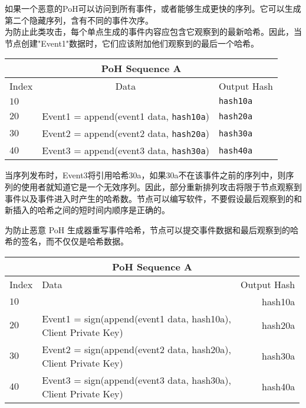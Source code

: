 \documentclass[12pt, uft8]{ctexart}
\begin{document}
如果一个恶意的PoH可以访问到所有事件，或者能够生成更快的序列。它可以生成第二个隐藏序列，含有不同的事件次序。\\

为防止此类攻击，每个单点生成的事件内容应包含它观察到的最新哈希。因此，当节点创建"Event1"数据时，它们应该附加他们观察到的最后一个哈希。    \\

\begin{center}
  \begin{tabular}{  l  c l}

    \multicolumn{3}{c}{PoH Sequence A} \\
    \hline
    Index  & Data & Output Hash  \\ \hline
    $10$ & & \texttt{hash10a} \\
    $20$ & Event1 = append(event1 data, \texttt{hash10a}) & \texttt{hash20a}  \\
    $30$ & Event2 = append(event2 data, \texttt{hash20a}) & \texttt{hash30a} \\
    $40$ &  Event3 = append(event3 data, \texttt{hash30a}) & \texttt{hash40a} \\
    \end{tabular}
\end{center}

当序列发布时，Event3将引用哈希30a，如果30a不在该事件之前的序列中，则序列的使用者就知道它是一个无效序列。因此，部分重新排列攻击将限于节点观察到事件以及事件进入时产生的哈希数。节点可以编写软件，不要假设最后观察到的和新插入的哈希之间的短时间内顺序是正确的。

为防止恶意 PoH 生成器重写事件哈希，节点可以提交事件数据和最后观察到的哈希的签名，而不仅仅是哈希数据。\\
\begin{center}
  \begin{tabular}{  l  l  r }
    \multicolumn{3}{c}{PoH Sequence A} \\
    \hline
    Index & Data & Output Hash \\ \hline
    $10$ & & hash10a  \\
    $20$ & \makecell{Event1 = sign(append(event1 data, hash10a), \\Client Private Key)} & hash20a\\
    $30$ & \makecell{Event2 = sign(append(event2 data, hash20a), \\Client Private Key)} & hash30a \\
    $40$ & \makecell{Event3 = sign(append(event3 data, hash30a), \\Client Private Key)} & hash40a \\

    \end{tabular}
\end{center}
\end{document}
